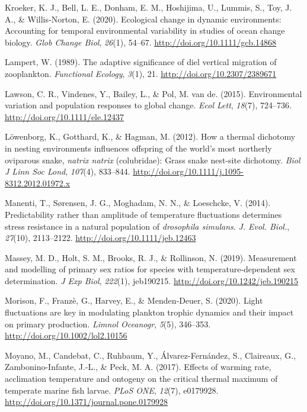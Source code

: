 \documentclass[12pt,twoside]{reedthesis}
\begin{document}
\leavevmode\hypertarget{ref-kroeker_ecological_2020}{}%
Kroeker, K. J., Bell, L. E., Donham, E. M., Hoshijima, U., Lummis, S., Toy, J. A., \& Willis‐Norton, E. (2020). Ecological change in dynamic environments: Accounting for temporal environmental variability in studies of ocean change biology. \emph{Glob Change Biol}, \emph{26}(1), 54--67. \url{http://doi.org/10.1111/gcb.14868}

\leavevmode\hypertarget{ref-lampert_adaptive_1989}{}%
Lampert, W. (1989). The adaptive significance of diel vertical migration of zooplankton. \emph{Functional Ecology}, \emph{3}(1), 21. \url{http://doi.org/10.2307/2389671}

\leavevmode\hypertarget{ref-lawson_environmental_2015}{}%
Lawson, C. R., Vindenes, Y., Bailey, L., \& Pol, M. van de. (2015). Environmental variation and population responses to global change. \emph{Ecol Lett}, \emph{18}(7), 724--736. \url{http://doi.org/10.1111/ele.12437}

\leavevmode\hypertarget{ref-lowenborg_how_2012}{}%
Löwenborg, K., Gotthard, K., \& Hagman, M. (2012). How a thermal dichotomy in nesting environments influences offspring of the world's most northerly oviparous snake, \emph{natrix natrix} (colubridae): Grass snake nest-site dichotomy. \emph{Biol J Linn Soc Lond}, \emph{107}(4), 833--844. \url{http://doi.org/10.1111/j.1095-8312.2012.01972.x}

\leavevmode\hypertarget{ref-manenti_predictability_2014-2}{}%
Manenti, T., Sørensen, J. G., Moghadam, N. N., \& Loeschcke, V. (2014). Predictability rather than amplitude of temperature fluctuations determines stress resistance in a natural population of \emph{drosophila simulans}. \emph{J. Evol. Biol.}, \emph{27}(10), 2113--2122. \url{http://doi.org/10.1111/jeb.12463}

\leavevmode\hypertarget{ref-massey_measurement_2019}{}%
Massey, M. D., Holt, S. M., Brooks, R. J., \& Rollinson, N. (2019). Measurement and modelling of primary sex ratios for species with temperature-dependent sex determination. \emph{J Exp Biol}, \emph{222}(1), jeb190215. \url{http://doi.org/10.1242/jeb.190215}

\leavevmode\hypertarget{ref-morison_light_2020}{}%
Morison, F., Franzè, G., Harvey, E., \& Menden‐Deuer, S. (2020). Light fluctuations are key in modulating plankton trophic dynamics and their impact on primary production. \emph{Limnol Oceanogr}, \emph{5}(5), 346--353. \url{http://doi.org/10.1002/lol2.10156}

\leavevmode\hypertarget{ref-moyano_effects_2017}{}%
Moyano, M., Candebat, C., Ruhbaum, Y., Álvarez-Fernández, S., Claireaux, G., Zambonino-Infante, J.-L., \& Peck, M. A. (2017). Effects of warming rate, acclimation temperature and ontogeny on the critical thermal maximum of temperate marine fish larvae. \emph{PLoS ONE}, \emph{12}(7), e0179928. \url{http://doi.org/10.1371/journal.pone.0179928}
\end{document}

